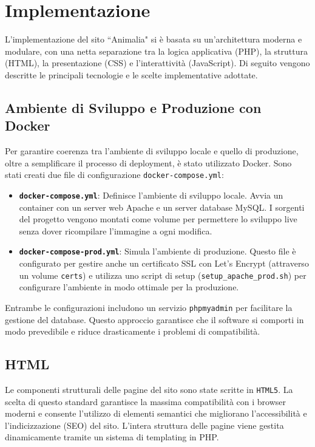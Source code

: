 \section{Implementazione}
L'implementazione del sito ``Animalia" si è basata su un'architettura moderna e modulare, con una netta separazione tra la logica applicativa (PHP), la struttura (HTML), la presentazione (CSS) e l'interattività (JavaScript). Di seguito vengono descritte le principali tecnologie e le scelte implementative adottate.

\subsection{Ambiente di Sviluppo e Produzione con Docker}
Per garantire coerenza tra l'ambiente di sviluppo locale e quello di produzione, oltre a semplificare il processo di deployment, è stato utilizzato Docker. Sono stati creati due file di configurazione \texttt{docker-compose.yml}:
\begin{itemize}
    \item \textbf{\texttt{docker-compose.yml}}: Definisce l'ambiente di sviluppo locale. Avvia un container con un server web Apache e un server database MySQL. I sorgenti del progetto vengono montati come volume per permettere lo sviluppo live senza dover ricompilare l'immagine a ogni modifica.
    \item \textbf{\texttt{docker-compose-prod.yml}}: Simula l'ambiente di produzione. Questo file è configurato per gestire anche un certificato SSL con Let's Encrypt (attraverso un volume \texttt{certs}) e utilizza uno script di setup (\texttt{setup\_apache\_prod.sh}) per configurare l'ambiente in modo ottimale per la produzione.
\end{itemize}
Entrambe le configurazioni includono un servizio \texttt{phpmyadmin} per facilitare la gestione del database. Questo approccio garantisce che il software si comporti in modo prevedibile e riduce drasticamente i problemi di compatibilità.

\subsection{HTML}
Le componenti strutturali delle pagine del sito sono state scritte in \texttt{HTML5}. La scelta di questo standard garantisce la massima compatibilità con i browser moderni e consente l'utilizzo di elementi semantici che migliorano l'accessibilità e l'indicizzazione (SEO) del sito. L'intera struttura delle pagine viene gestita dinamicamente tramite un sistema di templating in PHP.

